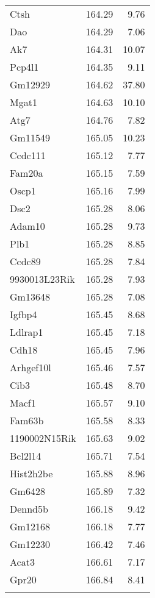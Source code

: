 \documentclass[oneside]{book}
\begin{document}
\begin{appendices}
{\begin{longtable}{lrr}
  Ctsh & 164.29 & 9.76 \\
  Dao & 164.29 & 7.06 \\
  Ak7 & 164.31 & 10.07 \\
  Pcp4l1 & 164.35 & 9.11 \\
  Gm12929 & 164.62 & 37.80 \\
  Mgat1 & 164.63 & 10.10 \\
  Atg7 & 164.76 & 7.82 \\
  Gm11549 & 165.05 & 10.23 \\
  Ccdc111 & 165.12 & 7.77 \\
  Fam20a & 165.15 & 7.59 \\
  Oscp1 & 165.16 & 7.99 \\
  Dsc2 & 165.28 & 8.06 \\
  Adam10 & 165.28 & 9.73 \\
  Plb1 & 165.28 & 8.85 \\
  Ccdc89 & 165.28 & 7.84 \\
  9930013L23Rik & 165.28 & 7.93 \\
  Gm13648 & 165.28 & 7.08 \\
  Igfbp4 & 165.45 & 8.68 \\
  Ldlrap1 & 165.45 & 7.18 \\
  Cdh18 & 165.45 & 7.96 \\
  Arhgef10l & 165.46 & 7.57 \\
  Cib3 & 165.48 & 8.70 \\
  Macf1 & 165.57 & 9.10 \\
  Fam63b & 165.58 & 8.33 \\
  1190002N15Rik & 165.63 & 9.02 \\
  Bcl2l14 & 165.71 & 7.54 \\
  Hist2h2be & 165.88 & 8.96 \\
  Gm6428 & 165.89 & 7.32 \\
  Dennd5b & 166.18 & 9.42 \\
  Gm12168 & 166.18 & 7.77 \\
  Gm12230 & 166.42 & 7.46 \\
  Acat3 & 166.61 & 7.17 \\
  Gpr20 & 166.84 & 8.41 \\
   \hline
  
  \label{tab:hot-annot}


\end{longtable}}
\end{appendices}
\end{document}
